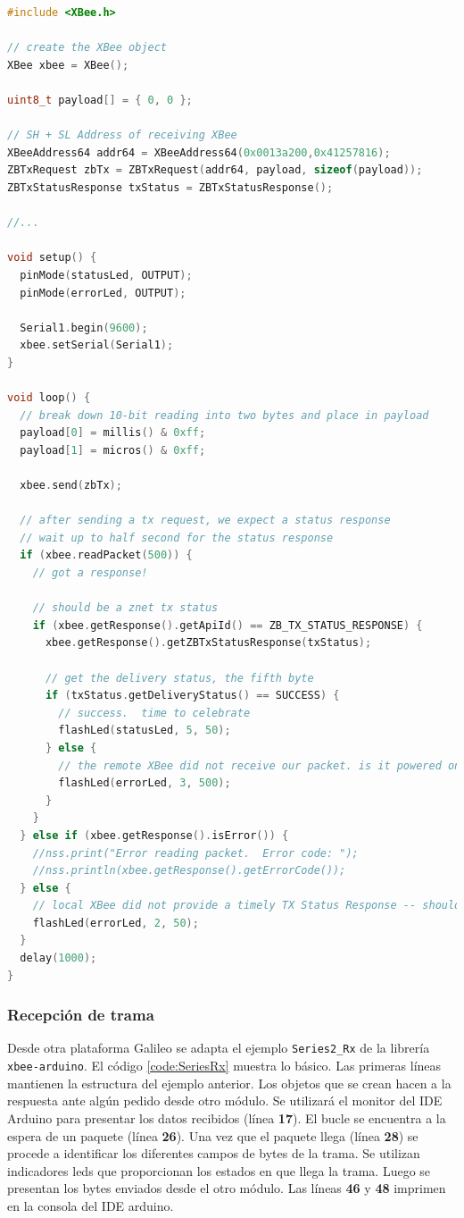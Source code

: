 \documentclass[11pt,oneside,spanish,a4paper]{article}
\begin{document}
\begin{lstlisting}[basicstyle=\ttfamily\small, language= C++,
  caption={Ejemplo \texttt{Series2\_Tx}},label=code:SeriesTx,
  frame=single]
#include <XBee.h>

// create the XBee object
XBee xbee = XBee();

uint8_t payload[] = { 0, 0 };

// SH + SL Address of receiving XBee
XBeeAddress64 addr64 = XBeeAddress64(0x0013a200,0x41257816);
ZBTxRequest zbTx = ZBTxRequest(addr64, payload, sizeof(payload));
ZBTxStatusResponse txStatus = ZBTxStatusResponse();

//...

void setup() {
  pinMode(statusLed, OUTPUT);
  pinMode(errorLed, OUTPUT);

  Serial1.begin(9600);
  xbee.setSerial(Serial1);
}

void loop() {   
  // break down 10-bit reading into two bytes and place in payload
  payload[0] = millis() & 0xff;
  payload[1] = micros() & 0xff;

  xbee.send(zbTx);

  // after sending a tx request, we expect a status response
  // wait up to half second for the status response
  if (xbee.readPacket(500)) {
    // got a response!

    // should be a znet tx status            	
    if (xbee.getResponse().getApiId() == ZB_TX_STATUS_RESPONSE) {
      xbee.getResponse().getZBTxStatusResponse(txStatus);

      // get the delivery status, the fifth byte
      if (txStatus.getDeliveryStatus() == SUCCESS) {
        // success.  time to celebrate
        flashLed(statusLed, 5, 50);
      } else {
        // the remote XBee did not receive our packet. is it powered on?
        flashLed(errorLed, 3, 500);
      }
    }
  } else if (xbee.getResponse().isError()) {
    //nss.print("Error reading packet.  Error code: ");  
    //nss.println(xbee.getResponse().getErrorCode());
  } else {
    // local XBee did not provide a timely TX Status Response -- should not happen
    flashLed(errorLed, 2, 50);
  }
  delay(1000);
}
\end{lstlisting}  

\subsubsection{Recepción  de trama}

Desde otra plataforma Galileo se adapta el ejemplo
\texttt{Series2\_Rx} de la librería \texttt{xbee-arduino}. El código
\ref{code:SeriesRx} muestra lo básico. Las primeras líneas mantienen
la estructura del ejemplo anterior. Los objetos que se crean hacen a
la respuesta ante algún pedido desde otro módulo. Se utilizará el
monitor del IDE Arduino para presentar los datos recibidos (línea
\textbf{17}). El bucle se encuentra a la espera de un paquete (línea
\textbf{26}). Una vez que el paquete llega (línea \textbf{28}) se
procede a identificar los diferentes campos de bytes de la trama. Se
utilizan indicadores leds que proporcionan los estados en que llega la
trama. Luego se presentan los bytes enviados desde el otro módulo. Las
líneas \textbf{46} y \textbf{48} imprimen en la consola del IDE
arduino. 
\end{document}
